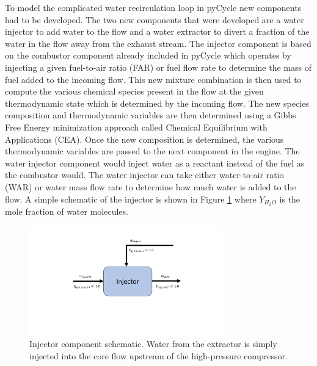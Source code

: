 \documentclass[conf]{new-aiaa}
\begin{document}
To model the complicated water recirculation loop in pyCycle new components had to be developed.
The two new components that were developed are a water injector to add water to the flow and a water extractor to divert a fraction of the water in the flow away from the exhaust stream.
The injector component is based on the combustor component already included in pyCycle which operates by injecting a given fuel-to-air ratio (FAR) or fuel flow rate to determine the mass of fuel added to the incoming flow.
This new mixture combination is then used to compute the various chemical species present in the flow at the given thermodynamic state which is determined by the incoming flow.
The new species composition and thermodynamic variables are then determined using a Gibbs Free Energy minimization approach called Chemical Equilibrium with Applications (CEA).
Once the new composition is determined, the various thermodynamic variables are passed to the next component in the engine.
The water injector component would inject water as a reactant instead of the fuel as the combustor would.
The water injector can take either water-to-air ratio (WAR) or water mass flow rate to determine how much water is added to the flow.
A simple schematic of the injector is shown in Figure \ref{fig:injector} where $Y_{H_2O}$ is the mole fraction of water molecules.

\begin{figure}[hbt!]
    \centering
    \includegraphics[width=0.75\textwidth]{injector.pdf}
    \caption{
        Injector component schematic.
        Water from the extractor is simply injected into the core flow upstream of the high-pressure compressor.
    }
    \label{fig:injector}
\end{figure}
\end{document}
